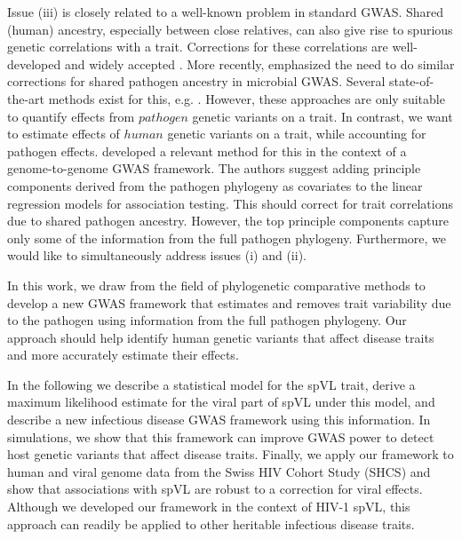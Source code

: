\documentclass[11pt]{article}
\begin{document}
\begin{linenumbers}
Issue (iii) is closely related to a well-known problem in standard GWAS. Shared (human) ancestry, especially between close relatives, can also give rise to spurious genetic correlations with a trait. Corrections for these correlations are well-developed and widely accepted  \citep{Astle2009, Price2006}. More recently, \citet{Power2017} emphasized the need to do similar corrections for shared pathogen ancestry in microbial GWAS. Several state-of-the-art methods exist for this, e.g. \citep{Earle2016, collins_phylogenetic_nodate}. 
However, these approaches are only suitable to quantify effects from $pathogen$ genetic variants on a trait. In contrast, we want to estimate effects of $human$ genetic variants on a trait, while accounting for pathogen effects. \citet{Naret2018} developed a relevant method for this in the context of a genome-to-genome GWAS framework. The authors suggest adding principle components derived from the pathogen phylogeny as covariates to the linear regression models for association testing. This should correct for trait correlations due to shared pathogen ancestry. However, the top principle components capture only some of the information from the full pathogen phylogeny. Furthermore, we would like to simultaneously address issues (i) and (ii).

In this work,  we draw from the field of phylogenetic comparative methods to develop a new GWAS framework that estimates and removes trait variability due to the pathogen using information from the full pathogen phylogeny. Our approach should help identify human genetic variants that affect disease traits and more accurately estimate their effects.

In the following we describe a statistical model for the spVL trait, derive a maximum likelihood estimate for the viral part of spVL under this model, and describe a new infectious disease GWAS framework using this information. In simulations, we show that this framework can improve GWAS power to detect host genetic variants that affect disease traits. Finally, we apply our framework to human and viral genome data from the Swiss HIV Cohort Study (SHCS) and show that associations with spVL are robust to a correction for viral effects. Although we developed our framework in the context of HIV-1 spVL, this approach can readily be applied to other heritable infectious disease traits. 


\end{linenumbers}
\end{document}
